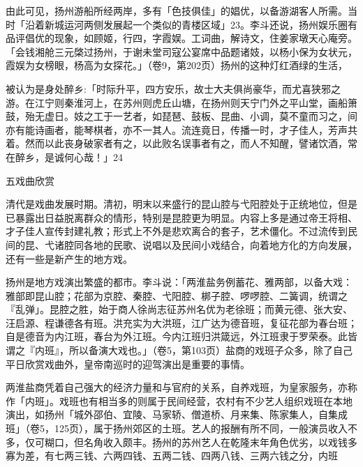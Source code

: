 由此可见，扬州游船所经两岸，多有「色技俱佳」的娼优，以备游湖客人所需。当时「沿着新城运河两侧发展起一个类似的青楼区域」23。李斗还说，扬州娱乐圈有品评倡优的现象，如顾姬，行四，字霞娱。工词曲，解诗文，住姜家墩天心庵旁。「会钱湘舱三元棨过扬州，于谢未堂司寇公宴席中品题诸妓，以杨小保为女状元，霞娱为女榜眼，杨高为女探花。」（卷9，第202页）扬州的这种灯红酒绿的生活，

\vfill
\begin{BookNotes}
\end{BookNotes}

\noindent 被认为是身处醉乡:「时际升平，四方安乐，故士大夫俱尚豪华，而尤喜狭邪之游。在江宁则秦淮河上，在苏州则虎丘山塘，在扬州则天宁门外之平山堂，画船箫鼓，殆无虚日。妓之工于一艺者，如琵琶、鼓板、昆曲、小调，莫不童而习之，间亦有能诗画者，能琴棋者，亦不一其人。流连竟日，传播一时，才子佳人，芳声共着。然而以此丧身破家者有之，以此败名误事者有之，而人不知醒，譬诸饮酒，常在醉乡，是诚何心哉！」24

五戏曲欣赏

清代是戏曲发展时期。清初，明末以来盛行的昆山腔与弋阳腔处于正统地位，但是已暴露出日益脱离群众的情形，特别是昆腔更为明显。内容上多是通过帝王将相、才子佳人宣传封建礼教；形式上不外是悲欢离合的套子，艺术僵化。不过流传到民间的昆、弋诸腔同各地的民歌、说唱以及民间小戏结合，向着地方化的方向发展，还有一些是新产生的地方戏。

扬州是地方戏演出繁盛的都市。李斗说：「两淮盐务例蓄花、雅两部，以备大戏：雅部即昆山腔；花部为京腔、秦腔、弋阳腔、梆子腔、啰啰腔、二簧调，统谓之『乱弹」。昆腔之胜，始于商人徐尚志征苏州名优为老徐班；而黄元德、张大安、汪启源、程谦德各有班。洪充实为大洪班，江广达为德音班，复征花部为春台班；自是德音为内江班，春台为外江班。今内江班归洪箴远，外江班隶于罗荣泰。此皆谓之『内班』，所以备演大戏也。」（卷5，第103页）盐商的戏班子众多，除了自己平日欣赏戏曲外，皇帝南巡时的迎驾演出是重要的事情。

两淮盐商凭着自己强大的经济力量和与官府的关系，自养戏班，为皇家服务，亦称作「内班」。戏班也有相当多的则属于民间经营，农村有不少艺人组织戏班在本地演出，如扬州「城外邵伯、宜陵、马家轿、僧道桥、月来集、陈家集人，自集成班」（卷5，125页），属于扬州郊区的土班。艺人的报酬有所不同，一般演员收入不多，仅可糊口，但名角收入颇丰。扬州的苏州艺人在乾隆末年角色优劣，以戏钱多寡为差，有七两三钱、六两四钱、五两二钱、四两八钱、三两六钱之分，内班

\vfill
\begin{BookNotes}
\end{BookNotes}

